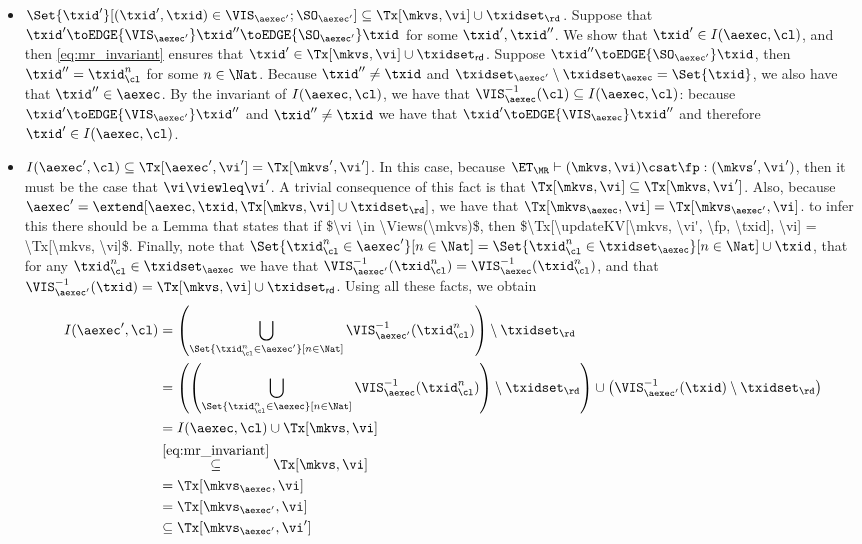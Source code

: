 \begin{itemize}
    \item $\Set{\txid' }[ (\txid', \txid) \in \VIS_{\aexec'} ; \SO_{\aexec'} ] \subseteq \Tx[\mkvs, \vi] \cup \txidset_\rd$. 
Suppose that $\txid' \toEDGE{\VIS_{\aexec'}} \txid'' \toEDGE{\SO_{\aexec'}} \txid$ 
for some $\txid', \txid''$. We show that $\txid' \in I(\aexec, \cl)$, and then \cref{eq:mr_invariant} ensures 
that $\txid' \in \Tx[\mkvs, \vi] \cup \txidset_{\mathsf{rd}}$. 
Suppose $\txid'' \toEDGE{\SO_{\aexec'}} \txid$, then $\txid'' = \txid_{\cl}^{n}$ for some $n \in \Nat$.
Because $\txid'' \neq \txid$ and $\txidset_{\aexec'} \setminus \txidset_{\aexec} = \Set{ \txid }$, we also 
have that $\txid'' \in \aexec$. By the invariant of $I(\aexec, \cl)$, 
we have that $\VIS^{-1}_{\aexec}(\cl) \subseteq I(\aexec, \cl)$:
because $\txid' \toEDGE{\VIS_{\aexec'}} \txid''$ and $\txid'' \neq \txid$ we have 
that $\txid' \toEDGE{\VIS_{\aexec}} \txid''$ and therefore $\txid' \in I(\aexec, \cl)$. 

\item $I(\aexec', \cl) \subseteq \Tx[\aexec', \vi'] = \Tx[\mkvs', \vi']$. 
    In this case, because $\ET_{\MR} \vdash (\mkvs, \vi) \csat \fp: (\mkvs',\vi')$, 
then it must be the case that $\vi \viewleq \vi'$. 
A trivial consequence of this fact is that $\Tx[\mkvs, \vi] \subseteq \Tx[\mkvs, \vi']$.
Also, because $\aexec' = \extend[\aexec, \txid, \Tx[\mkvs, \vi] \cup \txidset_{\rd}]$, 
we have that $\Tx[\mkvs_{\aexec}, \vi] = \Tx[\mkvs_{\aexec'}, \vi]$. 
%
%
%
\ac{to infer this there should be a Lemma that states that if $\vi \in \Views(\mkvs)$, 
then $\Tx[\updateKV[\mkvs, \vi', \fp, \txid], \vi] = \Tx[\mkvs, \vi]$.}
%
%
%
Finally, note that $\Set{\txid_{\cl}^{n} \in \aexec' }[ n \in \Nat] = 
\Set{ \txid_{\cl}^{n} \in \txidset_{\aexec} }[ n \in \Nat] \cup \txid$, that for any 
$\txid_{\cl}^{n} \in \txidset_{\aexec}$ we have that $\VIS^{-1}_{\aexec'}(\txid_{\cl}^{n}) = 
\VIS^{-1}_{\aexec}(\txid_{\cl}^{n})$, and that 
$\VIS_{\aexec'}^{-1}(\txid) = \Tx[\mkvs, \vi] \cup \txidset_{\mathsf{rd}}$. 
Using all these facts, we obtain 
\begin{align*}
    I(\aexec', \cl) 
    &= \left( \bigcup_{\Set{\txid_{\cl}^{n} \in \aexec' }[ n \in \Nat]} \VIS_{\aexec'}^{-1}(\txid_{\cl}^{n}) \right) \setminus \txidset_\rd \\
    &= \left( \left( \bigcup_{\Set{\txid_{\cl}^{n} \in \aexec }[ n \in \Nat]} \VIS_{\aexec}^{-1}(\txid_{\cl}^{n}) \right) \setminus \txidset_\rd  \right) \cup \left( \VIS^{-1}_{\aexec'}(\txid) \setminus \txidset_\rd  \right) \\
    &= I(\aexec, \cl) \cup \Tx[\mkvs, \vi] \\
    &\stackrel{\eqref{eq:mr_invariant}}{\subseteq} \Tx[\mkvs, \vi] \\
    &= \Tx[\mkvs_\aexec, \vi] \\
    &= \Tx[\mkvs_{\aexec'}, \vi] \\
    &\subseteq \Tx[\mkvs_{\aexec'}, \vi']
\end{align*}
\end{itemize}

